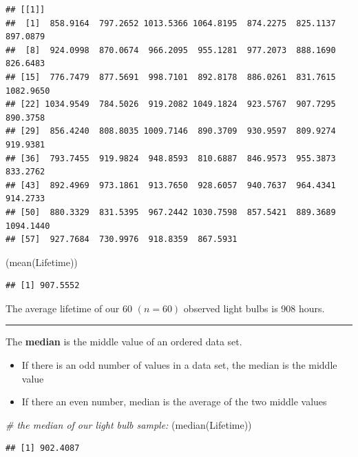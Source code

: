 \documentclass[
]{book}
\newenvironment{Shaded}{\begin{snugshade}}{\end{snugshade}}
\newcommand{\CommentTok}[1]{\textcolor[rgb]{0.56,0.35,0.01}{\textit{#1}}}
\newcommand{\FunctionTok}[1]{\textcolor[rgb]{0.00,0.00,0.00}{#1}}
\newcommand{\NormalTok}[1]{#1}
\begin{document}
\begin{verbatim}
## [[1]]
##  [1]  858.9164  797.2652 1013.5366 1064.8195  874.2275  825.1137  897.0879
##  [8]  924.0998  870.0674  966.2095  955.1281  977.2073  888.1690  826.6483
## [15]  776.7479  877.5691  998.7101  892.8178  886.0261  831.7615 1082.9650
## [22] 1034.9549  784.5026  919.2082 1049.1824  923.5767  907.7295  890.3758
## [29]  856.4240  808.8035 1009.7146  890.3709  930.9597  809.9274  919.9381
## [36]  793.7455  919.9824  948.8593  810.6887  846.9573  955.3873  833.2762
## [43]  892.4969  973.1861  913.7650  928.6057  940.7637  964.4341  914.2733
## [50]  880.3329  831.5395  967.2442 1030.7598  857.5421  889.3689 1094.1440
## [57]  927.7684  730.9976  918.8359  867.5931
\end{verbatim}

\begin{Shaded}
\begin{Highlighting}[]
\NormalTok{(}\FunctionTok{mean}\NormalTok{(Lifetime))}
\end{Highlighting}
\end{Shaded}

\begin{verbatim}
## [1] 907.5552
\end{verbatim}

The average lifetime of our 60 \((n=60)\) observed light bulbs is 908 hours.

\begin{center}\rule{0.5\linewidth}{0.5pt}\end{center}

The \textbf{median} is the middle value of an ordered data set.

\begin{itemize}
\item
  If there is an odd number of values in a data set, the median is the middle value
\item
  If there an even number, median is the average of the two middle values
\end{itemize}

\begin{Shaded}
\begin{Highlighting}[]
\CommentTok{\# the median of our light bulb sample:}
\NormalTok{(}\FunctionTok{median}\NormalTok{(Lifetime))}
\end{Highlighting}
\end{Shaded}

\begin{verbatim}
## [1] 902.4087
\end{verbatim}
\end{document}
